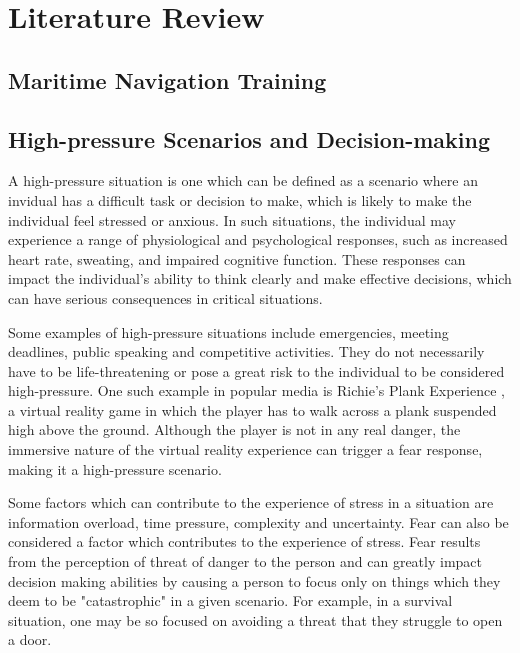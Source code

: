 \documentclass[12pt]{article}
\begin{document}
\section{Literature Review}

\subsection{Maritime Navigation Training}

\subsection{High-pressure Scenarios and Decision-making}

A high-pressure situation is one which can be defined as a scenario where an invidual has a difficult task or decision to make, which is likely to make the individual feel stressed or anxious. In such situations, the individual may experience a range of physiological and psychological responses, such as increased heart rate, sweating, and impaired cognitive function. These responses can impact the individual's ability to think clearly and make effective decisions, which can have serious consequences in critical situations.

Some examples of high-pressure situations include emergencies, meeting deadlines, public speaking and competitive activities. They do not necessarily have to be life-threatening or pose a great risk to the individual to be considered high-pressure. One such example in popular media is Richie's Plank Experience \cite{richiesplank}, a virtual reality game in which the player has to walk across a plank suspended high above the ground. Although the player is not in any real danger, the immersive nature of the virtual reality experience can trigger a fear response, making it a high-pressure scenario. \cite{el2023walk}

Some factors which can contribute to the experience of stress in a situation are information overload, time pressure, complexity and uncertainty. \cite{Phillips-Wren18082020} Fear can also be considered a factor which contributes to the experience of stress. \cite{klein2013effect} Fear results from the perception of threat of danger to the person and can greatly impact decision making abilities by causing a person to focus only on things which they deem to be "catastrophic" in a given scenario. \cite{chanel2009influence} For example, in a survival situation, one may be so focused on avoiding a threat that they struggle to open a door.
\end{document}
